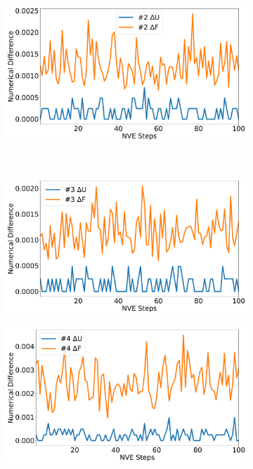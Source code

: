 \begin{figure}[htbp]
\begin{subfigure}{0.48\textwidth}
\includegraphics[width=\linewidth]{figs/rerun2.pdf}
\end{subfigure}
\\
\begin{subfigure}{0.48\textwidth}
\includegraphics[width=\linewidth]{figs/rerun3.pdf}
\end{subfigure}
\begin{subfigure}{0.48\textwidth}
\includegraphics[width=\linewidth]{figs/rerun4.pdf}

\end{subfigure}
\end{figure}
